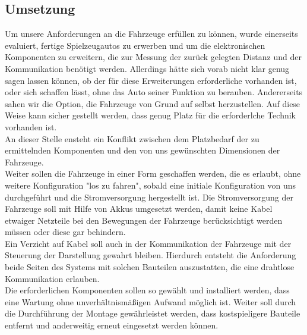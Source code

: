 \documentclass[.../Dokumentation.tex]{subfiles}
\begin{document}
\subsection{Umsetzung}\label{sec-concept-execution}
Um unsere Anforderungen an die Fahrzeuge erfüllen zu können, wurde 
einerseits evaluiert, fertige Spielzeugautos zu erwerben und um die 
elektronischen Komponenten zu erweitern, die zur Messung der zurück gelegten 
Distanz und der Kommunikation benötigt werden. Allerdings hätte sich vorab 
nicht klar genug sagen lassen können, ob der für diese Erweiterungen 
erforderliche vorhanden ist, oder sich schaffen lässt, ohne das Auto seiner 
Funktion zu berauben. Andererseits sahen wir die Option, die Fahrzeuge von 
Grund auf selbst herzustellen. Auf diese Weise kann sicher gestellt werden, 
dass genug Platz für die erforderlche Technik vorhanden ist.\\
An dieser Stelle ensteht ein Konflikt zwischen dem Platzbedarf der zu 
ermittelnden Komponenten und den von uns gewünschten Dimensionen der 
Fahrzeuge.\\
Weiter sollen die Fahrzeuge in einer Form geschaffen werden, die es erlaubt, 
ohne weitere Konfiguration "los zu fahren", sobald eine initiale Konfiguration 
von uns durchgeführt und die Stromversorgung hergestellt ist. 
Die Stromversorgung der Fahrzeuge soll mit Hilfe von Akkus umgesetzt werden, 
damit keine Kabel etwaiger Netzteile bei den Bewegungen der Fahrzeuge 
berücksichtigt werden müssen oder diese gar behindern.\\
Ein Verzicht auf Kabel soll auch in der Kommunikation der Fahrzeuge mit 
der Steuerung der Darstellung gewahrt bleiben.
Hierdurch entsteht die Anforderung beide Seiten des Systems mit solchen 
Bauteilen auszustatten, die eine drahtlose Kommunikation erlauben.\\
Die erforderlichen Komponenten sollen so gewählt und installiert werden, 
dass eine Wartung ohne unverhältnismäßigen Aufwand möglich ist. Weiter soll 
durch die Durchführung der Montage gewährleistet werden, dass kostspieligere 
Bauteile entfernt und anderweitig erneut eingesetzt werden können.
\end{document}
